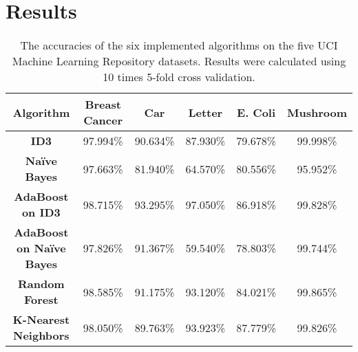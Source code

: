 \documentclass[11pt,titlepage]{article}
\newcommand{\bb}{\textbf}
\begin{document}
\section{Results}
\begin{table} [!htbp]
  \begin{tabular}{ |c|c|c|c|c|c| }
    \hline
    \bb{Algorithm}               & \bb{Breast Cancer} & \bb{Car} & \bb{Letter} & \bb{E. Coli}  & \bb{Mushroom} \\ \hline
    \bb{ID3}                     & 97.994\%           & 90.634\% & 87.930\%    & 79.678\%      & 99.998\%      \\ \hline
    \bb{Naïve Bayes}             & 97.663\%           & 81.940\% & 64.570\%    & 80.556\%      & 95.952\%      \\ \hline
    \bb{AdaBoost on ID3}         & 98.715\%           & 93.295\% & 97.050\%    & 86.918\%      & 99.828\%      \\ \hline
    \bb{AdaBoost on Naïve Bayes} & 97.826\%           & 91.367\% & 59.540\%    & 78.803\%      & 99.744\%      \\ \hline
    \bb{Random Forest}           & 98.585\%           & 91.175\% & 93.120\%    & 84.021\%      & 99.865\%      \\ \hline
    \bb{K-Nearest Neighbors}     & 98.050\%           & 89.763\% & 93.923\%    & 87.779\%      & 99.826\%      \\ \hline
  \end{tabular}
  \caption{The accuracies of the six implemented algorithms on the five UCI Machine Learning Repository datasets. Results were calculated using 10 times 5-fold cross validation.}
  \label{table:accuracies}
\end{table}
\end{document}
